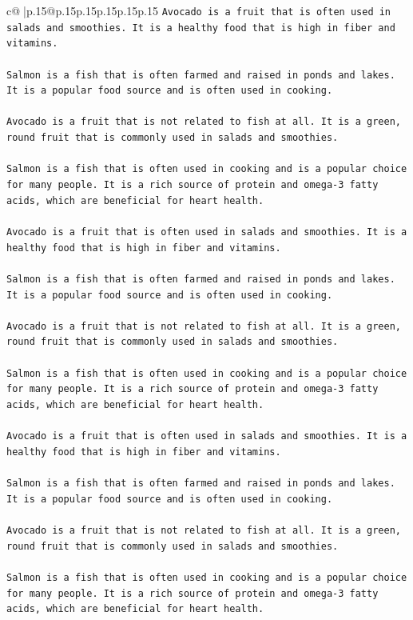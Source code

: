 \documentclass{article}
\begin{document}
{\begin{supertabular}{c@{$\;$}|p{.15\linewidth}@{}p{.15\linewidth}p{.15\linewidth}p{.15\linewidth}p{.15\linewidth}p{.15\linewidth}}
{{{\texttt{Avocado is a fruit that is often used in salads and smoothies. It is a healthy food that is high in fiber and vitamins.} \\
\\ 
\texttt{Salmon is a fish that is often farmed and raised in ponds and lakes. It is a popular food source and is often used in cooking.} \\
\\ 
\texttt{Avocado is a fruit that is not related to fish at all. It is a green, round fruit that is commonly used in salads and smoothies.} \\
\\ 
\texttt{Salmon is a fish that is often used in cooking and is a popular choice for many people. It is a rich source of protein and omega{-}3 fatty acids, which are beneficial for heart health.} \\
\\ 
\texttt{Avocado is a fruit that is often used in salads and smoothies. It is a healthy food that is high in fiber and vitamins.} \\
\\ 
\texttt{Salmon is a fish that is often farmed and raised in ponds and lakes. It is a popular food source and is often used in cooking.} \\
\\ 
\texttt{Avocado is a fruit that is not related to fish at all. It is a green, round fruit that is commonly used in salads and smoothies.} \\
\\ 
\texttt{Salmon is a fish that is often used in cooking and is a popular choice for many people. It is a rich source of protein and omega{-}3 fatty acids, which are beneficial for heart health.} \\
\\ 
\texttt{Avocado is a fruit that is often used in salads and smoothies. It is a healthy food that is high in fiber and vitamins.} \\
\\ 
\texttt{Salmon is a fish that is often farmed and raised in ponds and lakes. It is a popular food source and is often used in cooking.} \\
\\ 
\texttt{Avocado is a fruit that is not related to fish at all. It is a green, round fruit that is commonly used in salads and smoothies.} \\
\\ 
\texttt{Salmon is a fish that is often used in cooking and is a popular choice for many people. It is a rich source of protein and omega{-}3 fatty acids, which are beneficial for heart health.} \\
}}}
\end{supertabular}}
\end{document}
